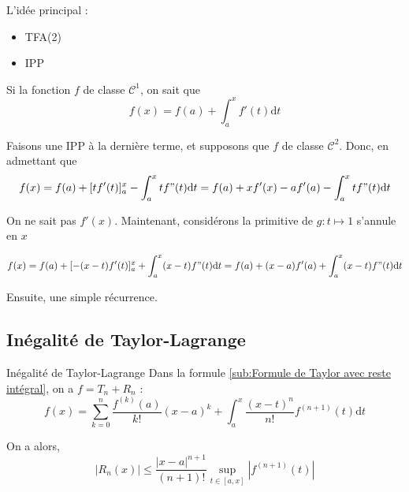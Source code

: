   \begin{note}{}{}
 L'idée principal : 
 \begin{itemize}

     \item TFA(2)
    \item IPP

 \end{itemize}
  \end{note}
\begin{myproof}{}{}


  

Si la fonction $f$ de classe $\mathscr{C} ^{1}$, on sait que 
\begin{equation}
  f(x) = f(a) + \int_{a}^{x} f'(t) \mathrm{d} t
\end{equation}

Faisons une IPP à la dernière terme, et supposons que $f$ de classe $\mathscr{C} ^{2}$. Donc, en admettant que 
\begin{equation}
  f(x) = f(a) + [tf'(t)] _a ^{x} - \int_{a}^{x} tf"(t) \mathrm{d}t = f(a) + xf'(x) - af'(a) - \int_{a}^{x} tf"(t) \mathrm{d}t
\end{equation}

On ne sait pas $f'(x)$. Maintenant, considérons la primitive de $g : t \mapsto 1$ s'annule en $x$

\begin{equation}
  f(x) = f(a) + [-(x-t)f'(t)] _a ^{x} + \int_{a}^{x}(x-t) f"(t) \mathrm{d}t = f(a) + (x-a) f'(a) + \int_{a}^{x} (x-t) f"(t) \mathrm{d}t
\end{equation}

Ensuite, une simple récurrence.
\end{myproof}

\subsection{Inégalité de Taylor-Lagrange} %
\label{sub:Inégalité de Taylor-Lagrange}

\begin{Theorem}{\color{red} Inégalité de Taylor-Lagrange}{}
  Dans la formule \ref{sub:Formule de Taylor avec reste intégral}, on a $f = T_n + R_n$ : 
  \begin{equation}
  f(x) = \sum_{k=0}^{n} \frac{f ^{(k)}(a)}{k!} (x-a) ^{k} + \int_{a}^{x} \frac{(x-t) ^{n}
  }{n!}  f ^{(n+1)}(t) \mathrm{d}t
  \end{equation}


On a alors, 
  \begin{equation}
    |R_n(x) | \le \frac{|x-a| ^{n+1}}{(n+1)!} \sup _{t \in [a,x]} |f ^{(n+1)}(t)|
  \end{equation}

\end{Theorem}

